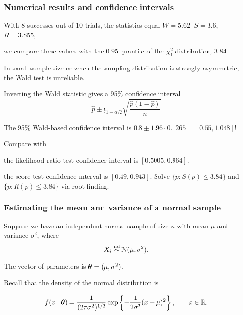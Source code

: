 \documentclass{beamer}
\begin{document}
 \begin{frame}[fragile]
 \frametitle{Numerical results and confidence intervals}
 \bi 
 \item With 8 successes out of 10 trials, the statistics equal $W=5.62$, $S=3.6$, $R = 3.855$;
 \item we compare these values with the $0.95$ quantile of the $\chi^2_1$ distribution, $3.84$.
 \ei
 \bi \item 
In small sample size or when the sampling distribution is strongly asymmetric, the Wald test is \alert{unreliable}.
\item 
 Inverting the Wald statistic gives a 95\% confidence interval \[\widehat{p} \pm \mathfrak{z}_{1-\alpha/2}\sqrt{\frac{\widehat{p}(1-\widehat{p})}{n}}\]
 \item The 95\% Wald-based confidence interval is $0.8 \pm 1.96 \cdot 0.1265 = [0.55, 1.048]$!
 \item Compare with 
 \bi \item the likelihood ratio test confidence interval is $[0.5005, 0.964]$.
 \item the score test confidence interval is $[0.49, 0.943]$.
  \ei 
  \ei 
  {\footnotesize Solve $\{p: S(p) \leq 3.84\}$ and $\{p: R(p) \leq 3.84\}$ via root finding.}
\end{frame}


% 
\begin{frame}
\frametitle{Estimating the mean and variance of a normal sample}
% 

\bi
\item Suppose we have an independent normal sample of  size $n$ with mean $\mu$ and variance $\sigma^2$, where
\begin{align*}
X_i \stackrel{\textnormal{iid}}{\sim} \mathcal{N}(\mu, \sigma^2).
\end{align*}
\item The vector of parameters is $\boldsymbol {\theta}=(\mu, \sigma^2)$. 
\item Recall that the density of the normal distribution is

\begin{align*}
f(x \mid \boldsymbol {\theta})=\frac{1}{(2\pi \sigma^2)^{1/2}}\exp\left\{-\frac{1}{2\sigma^2}(x-\mu)^2\right\}, \qquad x \in \mathbb{R}.
\end{align*}
\ei
\end{frame}
\end{document}

